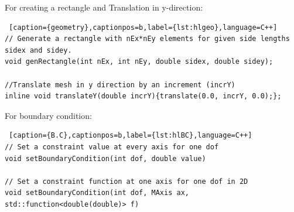 \documentclass[]{article}
\begin{document}
For creating a rectangle and Translation in y-direction:
\begin{lstlisting} [caption={geometry},captionpos=b,label={lst:hlgeo},language=C++]
// Generate a rectangle with nEx*nEy elements for given side lengths sidex and sidey.
void genRectangle(int nEx, int nEy, double sidex, double sidey);

//Translate mesh in y direction by an increment (incrY)
inline void translateY(double incrY){translate(0.0, incrY, 0.0);};
\end{lstlisting}

For boundary condition:
\begin{lstlisting} [caption={B.C},captionpos=b,label={lst:hlBC},language=C++]
// Set a constraint value at every axis for one dof
void setBoundaryCondition(int dof, double value)

// Set a constraint function at one axis for one dof in 2D
void setBoundaryCondition(int dof, MAxis ax, std::function<double(double)> f)
\end{lstlisting}
\end{document}
